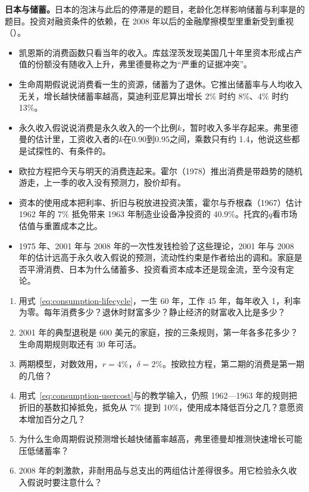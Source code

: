 \textbf{日本与储蓄。}日本的泡沫与此后的停滞是的题目，老龄化怎样影响储蓄与利率是的题目。投资对融资条件的依赖，在 2008 年以后的金融摩擦模型里重新受到重视（）。

\begin{takeaways}
\begin{itemize}
\item 凯恩斯的消费函数只看当年的收入。库兹涅茨发现美国几十年里资本形成占产值的份额没有随收入上升，弗里德曼称之为“严重的证据冲突”。
\item 生命周期假说说消费看一生的资源，储蓄为了退休。它推出储蓄率与人均收入无关，增长越快储蓄率越高，莫迪利亚尼算出增长 2\% 时约 8\%、4\% 时约 13\%。
\item 永久收入假说说消费是永久收入的一个比例$k$，暂时收入多半存起来。弗里德曼的估计里，工资收入者的$k$在$0.90$到$0.95$之间，乘数只有约 1.4，他说这些都是试探性的、有条件的。
\item 欧拉方程把今天与明天的消费连起来。霍尔（1978）推出消费是带趋势的随机游走，上一季的收入没有预测力，股价却有。
\item 资本的使用成本把利率、折旧与税放进投资决策，霍尔与乔根森（1967）估计 1962 年的 7\% 抵免带来 1963 年制造业设备净投资的 40.9\%。托宾的$q$看市场估值与重置成本之比。
\item 1975 年、2001 年与 2008 年的一次性发钱检验了这些理论，2001 年与 2008 年的估计远高于永久收入假说的预测，流动性约束是作者给出的调和。家庭是否平滑消费、日本为什么储蓄多、投资看资本成本还是现金流，至今没有定论。
\end{itemize}
\end{takeaways}

\begin{selfcheck}
\begin{enumerate}
\item 用式~\eqref{eq:consumption-lifecycle}，一生 60 年，工作 45 年，每年收入 1，利率为零。每年消费多少？退休时财富多少？静止经济的财富收入比是多少？
\item 2001 年的典型退税是 600 美元的家庭，按的三条规则，第一年各多花多少？生命周期规则取还有 30 年可活。
\item 两期模型，对数效用，$r=4\%$，$\delta=2\%$。按欧拉方程，第二期的消费是第一期的几倍？
\item 用式~\eqref{eq:consumption-usercost}与的教学输入，仍照 1962—1963 年的规则把折旧的基数扣掉抵免，抵免从 7\% 提到 10\%，使用成本降低百分之几？意愿资本增加百分之几？
\item 为什么生命周期假说预测增长越快储蓄率越高，弗里德曼却推测快速增长可能压低储蓄率？
\item 2008 年的刺激款，非耐用品与总支出的两组估计差得很多。用它检验永久收入假说时要注意什么？
\end{enumerate}
\end{selfcheck}

